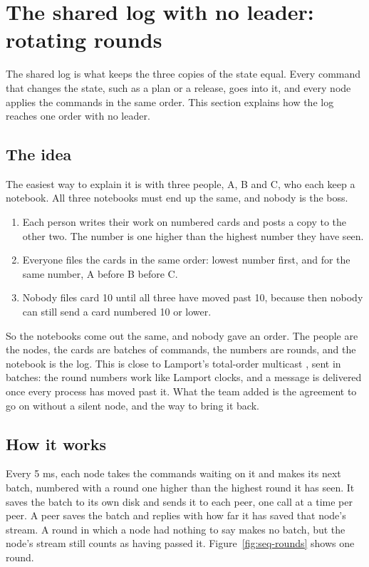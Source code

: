 \section{The shared log with no leader: rotating rounds}
\label{sec:sharedlog}

The shared log is what keeps the three copies of the state equal. Every command that changes the state, such as a plan or a release, goes into it, and every node applies the commands in the same order. This section explains how the log reaches one order with no leader.

\subsection{The idea}

The easiest way to explain it is with three people, A, B and C, who each keep a notebook. All three notebooks must end up the same, and nobody is the boss.

\begin{enumerate}
  \item Each person writes their work on numbered cards and posts a copy to the other two. The number is one higher than the highest number they have seen.
  \item Everyone files the cards in the same order: lowest number first, and for the same number, A before B before C.
  \item Nobody files card 10 until all three have moved past 10, because then nobody can still send a card numbered 10 or lower.
\end{enumerate}

So the notebooks come out the same, and nobody gave an order. The people are the nodes, the cards are batches of commands, the numbers are rounds, and the notebook is the log. This is close to Lamport's total-order multicast \cite{lamport}, sent in batches: the round numbers work like Lamport clocks, and a message is delivered once every process has moved past it. What the team added is the agreement to go on without a silent node, and the way to bring it back.

\subsection{How it works}

Every 5 ms, each node takes the commands waiting on it and makes its next batch, numbered with a round one higher than the highest round it has seen. It saves the batch to its own disk and sends it to each peer, one call at a time per peer. A peer saves the batch and replies with how far it has saved that node's stream. A round in which a node had nothing to say makes no batch, but the node's stream still counts as having passed it. Figure~\ref{fig:seq-rounds} shows one round.

